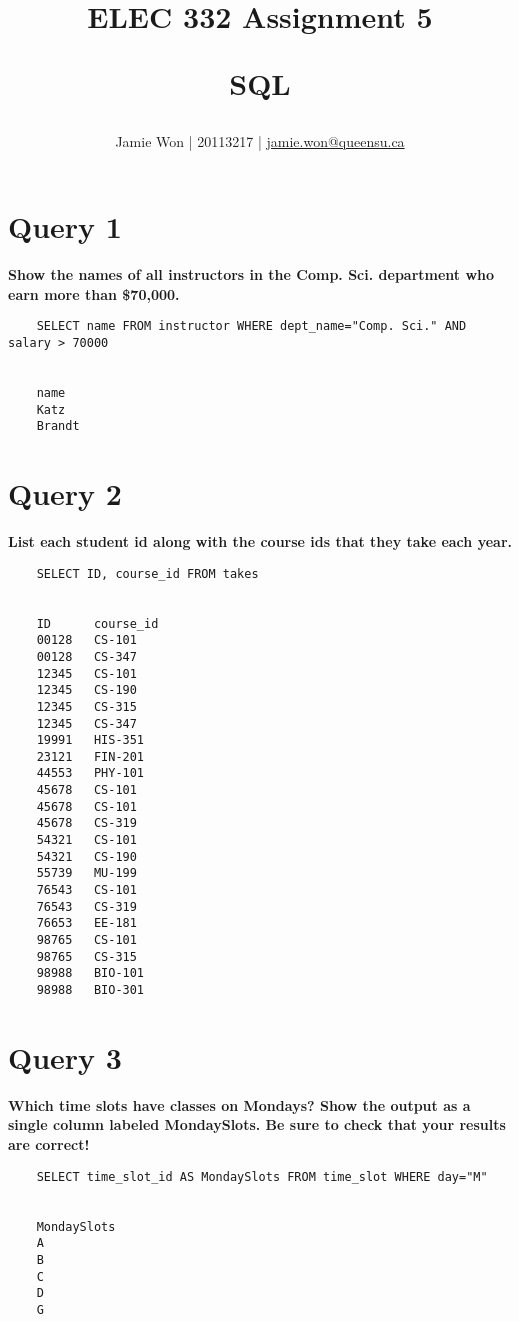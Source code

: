 \documentclass[letterpaper]{article}
\title{
    ELEC 332 Assignment 5 \\
    \begin{large}
        SQL
    \end{large}
}
\author{Jamie Won | 20113217 | \href{mailto:jamie.won@queensu.ca}{jamie.won@queensu.ca}}
\begin{document}
\maketitle
\tableofcontents

\cleardoublepage

\section{Query 1}

    \textbf{Show the names of all instructors in the Comp. Sci. department who earn more than \$70,000.}
    \begin{lstlisting}
    SELECT name FROM instructor WHERE dept_name="Comp. Sci." AND salary > 70000


    name	
    Katz	
    Brandt	
    \end{lstlisting}
        
\section{Query 2}

    \textbf{List each student id along with the course ids that they take each year.}
    \begin{lstlisting}
    SELECT ID, course_id FROM takes
    
    
    ID	    course_id	
    00128	CS-101	
    00128	CS-347	
    12345	CS-101	
    12345	CS-190	
    12345	CS-315	
    12345	CS-347	
    19991	HIS-351	
    23121	FIN-201	
    44553	PHY-101	
    45678	CS-101	
    45678	CS-101	
    45678	CS-319	
    54321	CS-101	
    54321	CS-190	
    55739	MU-199	
    76543	CS-101	
    76543	CS-319	
    76653	EE-181	
    98765	CS-101	
    98765	CS-315	
    98988	BIO-101	
    98988	BIO-301
    \end{lstlisting}
        
\section{Query 3}

    \textbf{Which time slots have classes on Mondays?  Show the output as a single column labeled MondaySlots.  Be sure to check that your results are correct!}
    \begin{lstlisting}
    SELECT time_slot_id AS MondaySlots FROM time_slot WHERE day="M"


    MondaySlots	
    A	
    B	
    C	
    D	
    G	
    \end{lstlisting}
        
\end{document}
